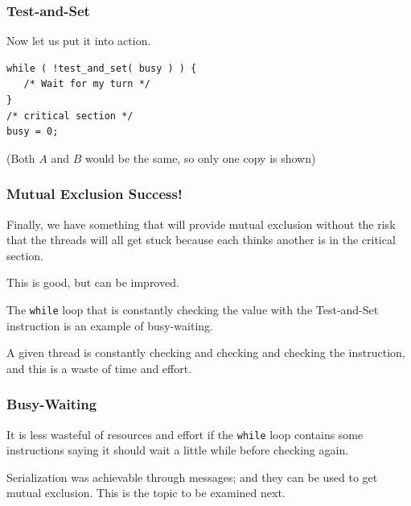 \begin{frame}[fragile]
\frametitle{Test-and-Set}

Now let us put it into action.

\begin{verbatim}
while ( !test_and_set( busy ) ) {
   /* Wait for my turn */
}
/* critical section */
busy = 0;
\end{verbatim}


(Both $A$ and $B$ would be the same, so only one copy is shown)


\end{frame}

\begin{frame}
\frametitle{Mutual Exclusion Success!}

Finally, we have something that will provide mutual exclusion without the risk that the threads will all get stuck because each thinks another is in the critical section. 

This is good, but can be improved. 

The \texttt{while} loop that is constantly checking the value with the Test-and-Set instruction is an example of \alert{busy-waiting}.

A given thread is constantly checking and checking and checking the instruction, and this is a waste of time and effort.

\end{frame}

\begin{frame}
\frametitle{Busy-Waiting}

It is less wasteful of resources and effort if the \texttt{while} loop contains some instructions saying it should wait a little while before checking again.

Serialization was achievable through messages; and they can be used to get mutual exclusion. This is the topic to be examined next.


\end{frame}



